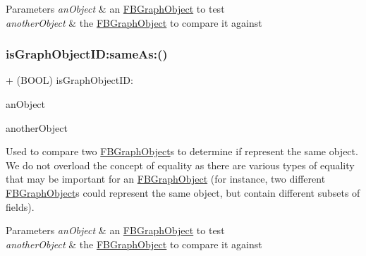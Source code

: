 \begin{DoxyParams}{Parameters}
{\em an\+Object} & an {\ttfamily \hyperlink{interfaceFBGraphObject}{F\+B\+Graph\+Object}} to test\\
\hline
{\em another\+Object} & the {\ttfamily \hyperlink{interfaceFBGraphObject}{F\+B\+Graph\+Object}} to compare it against \\
\hline
\end{DoxyParams}
\mbox{\label{interfaceFBGraphObject_a62b9fd3318de27294b10860c9a62160c}} 
\subsubsection{\texorpdfstring{is\+Graph\+Object\+I\+D\+:same\+As\+:()}{isGraphObjectID:sameAs:()}\hspace{0.1cm}{\footnotesize\ttfamily [3/5]}}
{\footnotesize\ttfamily + (B\+O\+OL) is\+Graph\+Object\+I\+D\+: \begin{DoxyParamCaption}\item[{(id$<$ \hyperlink{interfaceFBGraphObject}{F\+B\+Graph\+Object} $>$)}]{an\+Object }\item[{sameAs:(id$<$ \hyperlink{interfaceFBGraphObject}{F\+B\+Graph\+Object} $>$)}]{another\+Object }\end{DoxyParamCaption}}

Used to compare two {\ttfamily \hyperlink{interfaceFBGraphObject}{F\+B\+Graph\+Object}}s to determine if represent the same object. We do not overload the concept of equality as there are various types of equality that may be important for an {\ttfamily \hyperlink{interfaceFBGraphObject}{F\+B\+Graph\+Object}} (for instance, two different {\ttfamily \hyperlink{interfaceFBGraphObject}{F\+B\+Graph\+Object}}s could represent the same object, but contain different subsets of fields).


\begin{DoxyParams}{Parameters}
{\em an\+Object} & an {\ttfamily \hyperlink{interfaceFBGraphObject}{F\+B\+Graph\+Object}} to test\\
\hline
{\em another\+Object} & the {\ttfamily \hyperlink{interfaceFBGraphObject}{F\+B\+Graph\+Object}} to compare it against \\
\hline
\end{DoxyParams}
\mbox{\label{interfaceFBGraphObject_a62b9fd3318de27294b10860c9a62160c}} 
